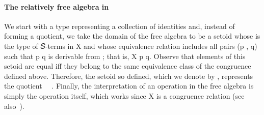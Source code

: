 \paragraph*{The relatively free algebra in \agda}
We start with a type  representing a collection of identities and, instead of
forming a quotient, we take the domain of the free algebra to be a setoid whose
 is the type  of {𝑆}-terms in \ab X and whose equivalence relation
includes all pairs (\ab p , \ab q)     such that \ab p 
\ab q is derivable from ; that is,   \ab X  \ab p  \ab q.
Observe that elements of this setoid are equal iff they belong to the same equivalence
class of the congruence  defined above.  Therefore, the setoid so defined, which
we denote by , represents the quotient ~\af{/}~.
Finally, the interpretation of an operation in the free algebra is simply the operation
itself, which works since   \ab X  is a congruence
relation (see also~\cite{Abel:2021}).

